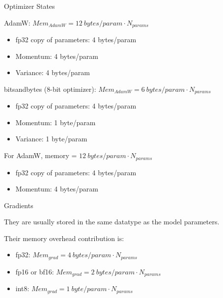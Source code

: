 
\begin{vbframe}{Optimizer States}

\vfill

AdamW: $Mem_{AdamW} = 12 ~bytes/param \cdot N_{params}$
\begin{itemize}
 	\item fp32 copy of parameters: 4 bytes/param
 	\item Momentum: 4 bytes/param
	\item Variance: 4 bytes/param
\end{itemize}

\vskip3mm

bitsandbytes (8-bit optimizer): $Mem_{AdamW} = 6 ~bytes/param \cdot N_{params}$
\begin{itemize}
 	\item fp32 copy of parameters: 4 bytes/param
 	\item Momentum: 1 byte/param
	\item Variance: 1 byte/param
\end{itemize}

\vskip3mm

For AdamW, memory = $ 12 ~bytes/param \cdot N_{params}$
\begin{itemize}
 	\item fp32 copy of parameters: 4 bytes/param
 	\item Momentum: 4 bytes/param
\end{itemize}

\vfill

\end{vbframe}


\begin{vbframe}{Gradients}

\vfill

They are usually stored in the same datatype as the model parameters. \newline

Their memory overhead contribution is: \newline


\begin{itemize}
 	\item fp32: $Mem_{grad} = 4 ~bytes/param \cdot N_{params}$
 	\item fp16 or bf16: $Mem_{grad} = 2 ~bytes/param \cdot N_{params}$
	\item int8: $Mem_{grad} = 1 ~byte/param \cdot N_{params}$
\end{itemize}

\vfill

\end{vbframe}

